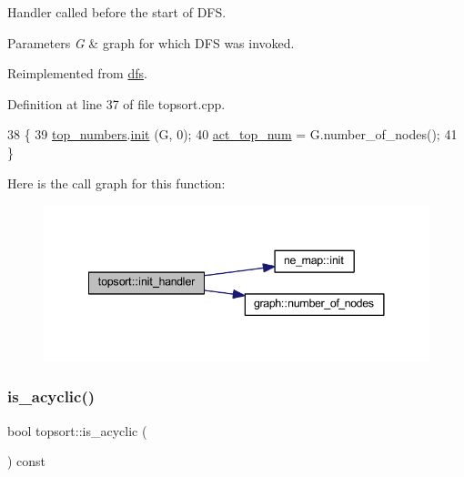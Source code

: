 Handler called before the start of D\+FS. 


\begin{DoxyParams}{Parameters}
{\em G} & graph for which D\+FS was invoked. \\
\hline
\end{DoxyParams}


Reimplemented from \mbox{\hyperlink{classdfs_aae46a50d0c73c63bf72e483668fd22a2}{dfs}}.



Definition at line 37 of file topsort.\+cpp.


\begin{DoxyCode}
38 \{
39     \mbox{\hyperlink{classtopsort_ae57da1aae22ed92acd0d84c737a1da2b}{top\_numbers}}.\mbox{\hyperlink{classne__map_a4ef2ab4aebcb57a7a101975bf6a88e24}{init}} (G, 0);
40     \mbox{\hyperlink{classtopsort_ae04dea9ee7f97be6e0e9673afb601f96}{act\_top\_num}} = G.number\_of\_nodes();
41 \}
\end{DoxyCode}
Here is the call graph for this function\+:\nopagebreak
\begin{figure}[H]
\begin{center}
\leavevmode
\includegraphics[width=341pt]{classtopsort_a21aaf28fc280094ed43288e58d8e3ae1_cgraph}
\end{center}
\end{figure}
\mbox{\label{classtopsort_a05a4cb00bbd60859f4939355b23c25f1}} 
\subsubsection{\texorpdfstring{is\+\_\+acyclic()}{is\_acyclic()}}
{\footnotesize\ttfamily bool topsort\+::is\+\_\+acyclic (\begin{DoxyParamCaption}{ }\end{DoxyParamCaption}) const\hspace{0.3cm}{\ttfamily [inline]}}

